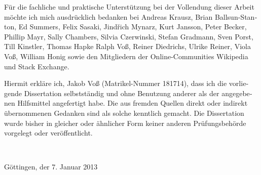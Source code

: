 \begin{otherlanguage}{ngerman}

Für die fachliche und praktische Unterstützung bei der Vollendung dieser Arbeit
möchte ich mich ausdrücklich bedanken bei
Andreas Krausz,
Brian Ballsun-Stanton,
Ed Summers,
Felix Sasaki,
Jindřich Mynarz,
Kurt Jansson,
Peter Becker,
Phillip Mayr,
Sally Chambers,
Silvia Czerwinski, 
Stefan Gradmann,
Sven Porst,
Till Kinstler,
Thomas Hapke
Ralph Voß,
Reiner Diedrichs,
Ulrike Reiner,
Viola Voß,
William Honig
sowie den Mitgliedern der Online-Communities Wikipedia und Stack Exchange.


\cleardoublepage


Hiermit erkläre ich, Jakob Voß (Matrikel-Nummer 181714), dass ich die
vorliegende Dissertation selbstständig und ohne Benutzung anderer als der
angegebenen Hilfsmittel angefertigt habe.  Die aus fremden Quellen direkt oder
indirekt übernommenen Gedanken sind als solche kenntlich gemacht.  Die
Dissertation wurde bisher in gleicher oder ähnlicher Form keiner anderen
Prüfungsbehörde vorgelegt oder veröffentlicht.

~

Göttingen, der 7. Januar 2013


\end{otherlanguage}
